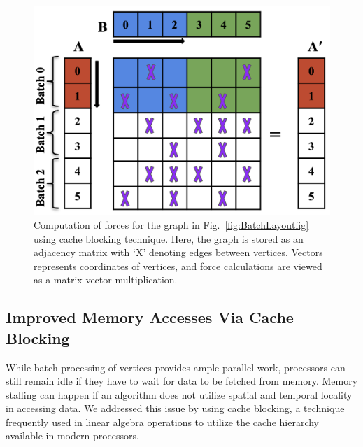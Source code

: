 \documentclass{vgtc}
\begin{document}
\begin{figure}
    \centering
    \includegraphics[width=0.7\linewidth]{figures/cacheblockingu.png}
    \vspace{-0.2cm}
    \caption{Computation of forces for the graph in Fig.~\ref{fig:BatchLayoutfig} using cache blocking technique. Here, the graph is stored as an adjacency matrix with `X' denoting edges between vertices. Vectors represents coordinates of vertices, and force calculations are viewed as a matrix-vector multiplication.
    }
    \vspace{-0.3cm}
    \label{fig:cacheblocking}
\end{figure}

\subsection{Improved Memory Accesses Via Cache Blocking}
While batch processing of vertices provides ample parallel work, processors can still remain idle if they have to wait for data to be fetched from memory.  
Memory stalling can happen if an algorithm does not utilize spatial and temporal locality in accessing data.
We addressed this issue by using cache blocking, a technique frequently used in linear algebra operations to utilize the cache hierarchy available in modern processors. 


\end{document}
